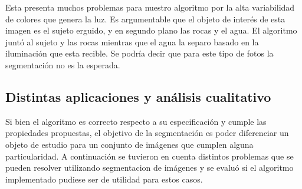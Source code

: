 \indent Esta presenta muchos problemas para nuestro algoritmo por la alta variabilidad de colores que genera la luz. Es argumentable que el objeto de interés de esta imagen es el sujeto erguido, y en segundo plano las rocas y el agua. El algoritmo junt\'o al sujeto y las rocas mientras que el agua la separo basado en la iluminaci\'on que esta recible. Se podr\'ia decir que para este tipo de fotos la segmentaci\'on no es la esperada.
 

\subsection{Distintas aplicaciones y an\'alisis cualitativo}
Si bien el algoritmo es correcto respecto a su especificaci\'on y cumple las propiedades propuestas, el objetivo de la segmentaci\'on es poder diferenciar un objeto de estudio para un conjunto de im\'agenes que cumplen alguna particularidad. A continuaci\'on se tuvieron en cuenta distintos problemas que se pueden resolver utilizando segmentacion de im\'agenes y se evalu\'o si el algoritmo implementado pudiese ser de utilidad para estos casos.

